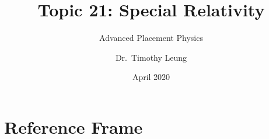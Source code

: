 \documentclass[12pt,compress,aspectratio=169]{beamer}
\title{Topic 21: Special Relativity}
\subtitle{Advanced Placement Physics}
\author[TML]{Dr.\ Timothy Leung}
\institute{Olympiads School\\Toronto, Ontario, Canada}
\date{April 2020}
\begin{document}
\begin{frame}
  \maketitle
\end{frame}

%
%
%


\section{Reference Frame}
\end{document}
